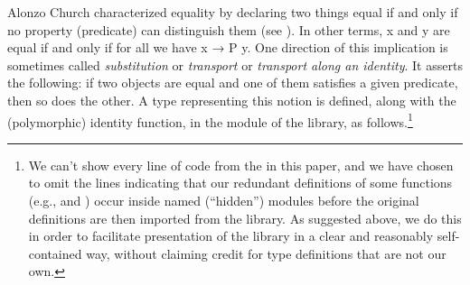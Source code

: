 Alonzo Church characterized equality by declaring two things equal if and only if no property (predicate) can distinguish them (see \cite{Church:1940}). In other terms, \ab x and \ab y are equal if and only if for all  we have  \ab x \as → \ab P \ab y. One direction of this implication is sometimes called \emph{substitution} or \emph{transport} or \emph{transport along an identity}. It asserts the following: if two objects are equal and one of them satisfies a given predicate, then so does the other. A type representing this notion is defined, along with the (polymorphic) identity function, in the  module of the \typetopology library, as follows.\footnote{We can't show every line of code from the \ualib in this paper, and we have chosen to omit the lines indicating that our redundant definitions of some functions (e.g.,  and ) occur inside named (``hidden'') modules before the original definitions are then imported from the \typetopology library. As suggested above, we do this in order to facilitate presentation of the \ualib library in a clear and reasonably self-contained way, without claiming credit for type definitions that are not our own.}
\ccpad
